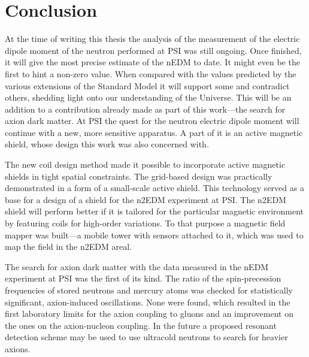 
\begingroup

\let\clearpage\relax
\let\cleardoublepage\relax
\let\cleardoublepage\relax

\chapter*{Conclusion}
At the time of writing this thesis the analysis of the measurement of the electric dipole moment of the neutron performed at PSI was still ongoing.
Once finished, it will give the most precise estimate of the nEDM to date.
It might even be the first to hint a non-zero value.
When compared with the values predicted by the various extensions of the Standard Model it will support some and contradict others, shedding light onto our understanding of the Universe.
This will be an addition to a contribution already made as part of this work---the search for axion dark matter.
At PSI the quest for the neutron electric dipole moment will continue with a new, more sensitive apparatus.
A part of it is an active magnetic shield, whose design this work was also concerned with.

The new coil design method made it possible to incorporate active magnetic shields in tight spatial constraints.
The grid-based design was practically demonstrated in a form of a small-scale active shield.
This technology served as a base for a design of a shield for the n2EDM experiment at PSI\@.
The n2EDM shield will perform better if it is tailored for the particular magnetic environment by featuring coils for high-order variations.
To that purpose a magnetic field mapper was built---a mobile tower with sensors attached to it, which was used to map the field in the n2EDM areal.

The search for axion dark matter with the data measured in the nEDM experiment at PSI was the first of its kind.
The ratio of the spin-precession frequencies of stored neutrons and mercury atoms was checked for statistically significant, axion-induced oscillations.
None were found, which resulted in the first laboratory limits for the axion coupling to gluons and an improvement on the ones on the axion-nucleon coupling.
In the future a proposed resonant detection scheme may be used to use ultracold neutrons to search for heavier axions.

\endgroup